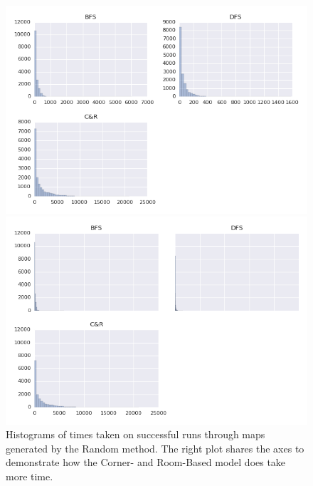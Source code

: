 \documentclass[12pt]{article}
\begin{document}
\begin{figure}[htbp]
\begin{minipage}{.48\linewidth}
\centering
\includegraphics[width=1\linewidth]{TimeHistRandom.png} 
\end{minipage}
\begin{minipage}{.48\linewidth}
\centering
\includegraphics[width=1\linewidth]{TimeHistRandomShare.png} 
\end{minipage}
\caption{Histograms of times taken on successful runs through maps generated by the Random method. The right plot shares the axes to demonstrate how the Corner- and Room-Based model does take more time.}
\end{figure} 
\end{document}
